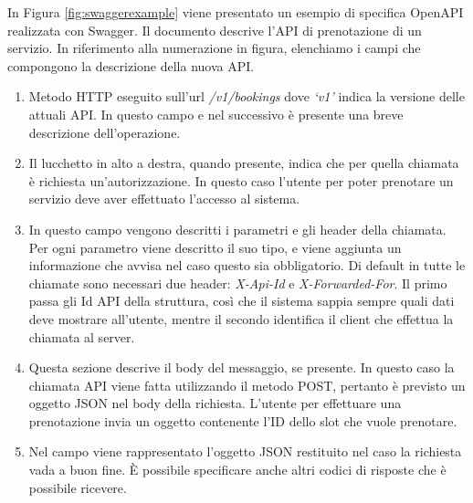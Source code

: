 In Figura \ref{fig:swaggerexample} viene presentato un esempio di specifica OpenAPI realizzata con Swagger. Il documento descrive l'API di prenotazione di un servizio. In riferimento alla numerazione in figura, elenchiamo i campi che compongono la descrizione della nuova API.
\begin{enumerate}
    \item Metodo HTTP eseguito sull'url \emph{/v1/bookings} dove  \emph{`v1'} indica la versione delle attuali API. In questo campo e nel successivo è presente una breve descrizione dell'operazione.
    \item Il lucchetto in alto a destra, quando presente, indica che per quella chiamata è richiesta un'autorizzazione. In questo caso l'utente per poter prenotare un servizio deve aver effettuato l'accesso al sistema.
    \item In questo campo vengono descritti i parametri e gli header della chiamata. Per ogni parametro viene descritto il suo tipo, e viene aggiunta un informazione che avvisa nel caso questo sia obbligatorio. Di default in tutte le chiamate sono necessari due header: \emph{X-Api-Id} e \emph{X-Forwarded-For}. Il primo passa gli Id API della struttura, così che il sistema sappia sempre quali dati deve mostrare all'utente, mentre il secondo identifica il client che effettua la chiamata al server.
    \item Questa sezione descrive il body del messaggio, se presente. In questo caso la chiamata API viene fatta utilizzando il metodo POST, pertanto è previsto un oggetto JSON nel body della richiesta. L'utente per effettuare una prenotazione invia un oggetto contenente l'ID dello slot che vuole prenotare.
    \item Nel campo viene rappresentato l'oggetto JSON restituito nel caso la richiesta vada a buon fine. È possibile specificare anche altri codici di risposte che è possibile ricevere.
\end{enumerate}

